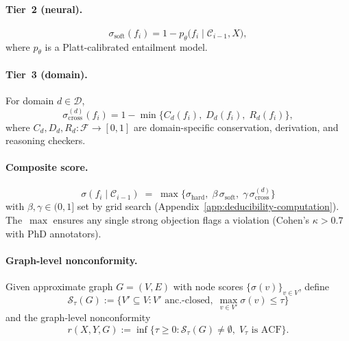 \documentclass{uai2026} %
\theoremstyle{remark}
\theoremstyle{plain}
\theoremstyle{definition}
\begin{document}
\paragraph{Tier~2 (neural).}
\begin{equation}\label{eq:soft}
  \sigma_{\mathrm{soft}}(f_{i})
  = 1-p_{\theta}
  \bigl(f_{i}\mid \mathcal{C}_{i-1},X\bigr),
\end{equation}
where $p_{\theta}$ is a Platt-calibrated entailment model.

\paragraph{Tier~3 (domain).}
For domain $d\in\mathcal{D}$,
\begin{equation}\label{eq:cross}
  \sigma_{\mathrm{cross}}^{(d)}(f_{i})
  = 1 - \min\!\bigl\{
    C_{d}(f_{i}),\;
    D_{d}(f_{i}),\;
    R_{d}(f_{i})
  \bigr\},
\end{equation}
where $C_{d},D_{d},R_{d}\!:\mathcal{F}\to[0,1]$ are
domain-specific conservation, derivation, and reasoning
checkers.

\paragraph{Composite score.}
\begin{equation}\label{eq:composite}
\boxed{\;
  \sigma(f_{i}\mid\mathcal{C}_{i-1})
  \;=\;
  \max\!\bigl\{
    \sigma_{\mathrm{hard}},\;
    \beta\,\sigma_{\mathrm{soft}},\;
    \gamma\,\sigma_{\mathrm{cross}}^{(d)}
  \bigr\}
\;}
\end{equation}
with $\beta,\gamma\!\in\!(0,1]$ set by grid search
(Appendix~\ref{app:deducibility-computation}).
The~$\max$ ensures any single strong objection flags a
violation (Cohen's $\kappa>0.7$ with PhD annotators).

\paragraph{Graph-level nonconformity.}
Given approximate graph $G=(V,E)$ with node scores
$\{\sigma(v)\}_{v\in V}$, define
\begin{equation}\label{eq:subgraph-family}
  \mathcal{S}_{\tau}(G)
  :=\bigl\{V'\!\subseteq\!V:
  V'\text{ anc.-closed},\;
  \max_{v\in V'}\sigma(v)\le\tau
  \bigr\}
\end{equation}
and the graph-level nonconformity
\begin{equation}\label{eq:graph-nc}
  r(X,Y,G)
  :=\inf\bigl\{\tau\!\ge\!0:
  \mathcal{S}_{\tau}(G)\neq\emptyset,\;
  V_{\tau}\text{ is ACF}\bigr\}.
\end{equation}
\end{document}

